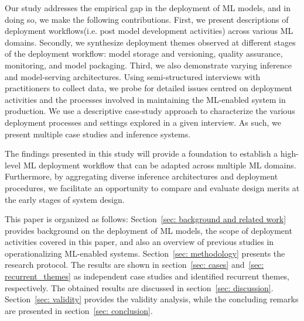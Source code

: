 Our study addresses the empirical gap in the deployment of ML models, and in doing so, we make the following contributions. First, we present descriptions of deployment workflows(i.e. post model development activities) across various ML domains. Secondly, we synthesize deployment themes observed at different stages of the deployment workflow: model storage and versioning, quality assurance, monitoring, and model packaging. Third, we also demonstrate varying inference and model-serving architectures.
Using semi-structured interviews with practitioners to collect data, we probe for detailed issues centred on deployment activities and the processes involved in maintaining the ML-enabled system in production. We use a descriptive case-study approach to characterize the various deployment processes and settings explored in a given interview. As such, we present multiple case studies and inference systems.

The findings presented in this study will provide a foundation to establish a high-level ML deployment workflow that can be adapted across multiple ML domains. Furthermore, by aggregating diverse inference architectures and deployment procedures, we facilitate an opportunity to compare and evaluate design merits at the early stages of system design. %

This paper is organized as follows: Section~\ref{sec: background and related work} provides background on the deployment of ML models, the scope of deployment activities covered in this paper, and also an overview of previous studies in operationalizing ML-enabled systems. Section~\ref{sec: methodology} presents the research protocol. The results are shown in section~\ref{sec: cases} and~\ref{sec: recurrent_themes} as independent case studies and identified recurrent themes, respectively. The obtained results are discussed in section~\ref{sec: discussion}. Section~\ref{sec: validity} provides the validity analysis, while the concluding remarks are presented in section~\ref{sec: conclusion}.

